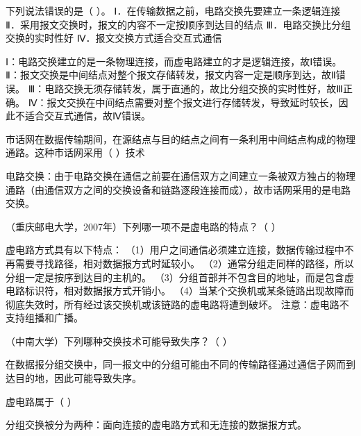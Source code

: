 \question 下列说法错误的是（ ）。 Ⅰ．在传输数据之前，电路交换先要建立一条逻辑连接
Ⅱ．采用报文交换时，报文的内容不一定按顺序到达目的结点
Ⅲ．电路交换比分组交换的实时性好 Ⅳ．报文交换方式适合交互式通信
\par{}
\begin{solution}Ⅰ：电路交换建立的是一条物理连接，而虚电路建立的才是逻辑连接，故Ⅰ错误。
Ⅱ：报文交换是中间结点对整个报文存储转发，报文内容一定是顺序到达，故Ⅱ错误。
Ⅲ：电路交换无须存储转发，属于直通的，故比分组交换的实时性好，故Ⅲ正确。
Ⅳ：报文交换在中间结点需要对整个报文进行存储转发，导致延时较长，因此不适合交互式通信，故Ⅳ错误。
\end{solution}
\question 市话网在数据传输期间，在源结点与目的结点之间有一条利用中间结点构成的物理通路。这种市话网采用（
）技术
\par{}
\begin{solution}电路交换：由于电路交换在通信之前要在通信双方之间建立一条被双方独占的物理通路（由通信双方之间的交换设备和链路逐段连接而成），故市话网采用的是电路交换。
\end{solution}
\question （重庆邮电大学，2007年）下列哪一项不是虚电路的特点？（ ）
\par{}
\begin{solution}虚电路方式具有以下特点：
（1）用户之间通信必须建立连接，数据传输过程中不再需要寻找路径，相对数据报方式时延较小。
（2）通常分组走同样的路径，所以分组一定是按序到达目的主机的。
（3）分组首部并不包含目的地址，而是包含虚电路标识符，相对数据报方式开销小。
（4）当某个交换机或某条链路出现故障而彻底失效时，所有经过该交换机或该链路的虚电路将遭到破坏。
注意：虚电路不支持组播和广播。
\end{solution}
\question （中南大学）下列哪种交换技术可能导致失序？（ ）
\par{}
\begin{solution}在数据报分组交换中，同一报文中的分组可能由不同的传输路径通过通信子网而到达目的地，因此可能导致失序。
\end{solution}
\question 虚电路属于（ ）
\par{}
\begin{solution}分组交换被分为两种：面向连接的虚电路方式和无连接的数据报方式。
\end{solution}
